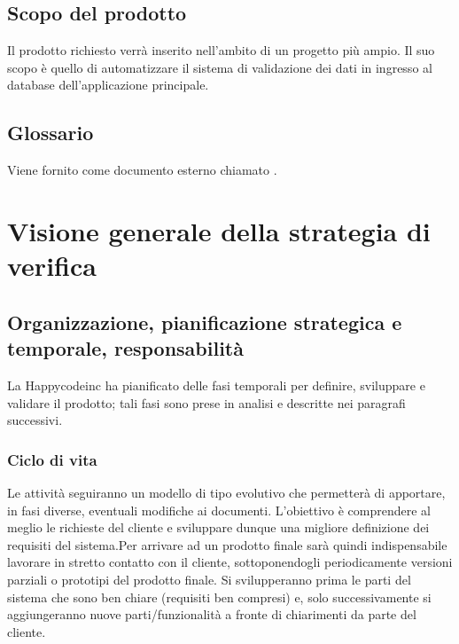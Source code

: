 \documentclass[11pt,titlepage,a4paper]{report}
\begin{document}
\section{Scopo del prodotto}
Il prodotto richiesto verr\`a inserito nell'ambito di un progetto pi\`u ampio. Il suo scopo \`e quello di automatizzare il sistema di validazione dei dati in ingresso al database dell'applicazione principale.

\section{Glossario}
Viene fornito come documento esterno chiamato \Glossario.

\chapter[Strategia di verifica]{Visione generale della strategia di verifica}
\section[Organizzazione, pianificazione, responsabilit\`a]{Organizzazione, pianificazione strategica e temporale, responsabilit\`a}
La Happycodeinc ha  pianificato delle fasi temporali per definire, sviluppare e validare il prodotto; tali fasi sono prese in analisi e descritte nei paragrafi successivi.

\subsection{Ciclo di vita}
Le attivit\`a seguiranno un modello di tipo evolutivo che permetter\`a di apportare, in fasi diverse, eventuali modifiche ai documenti. L'obiettivo \`e comprendere al meglio le richieste del cliente e sviluppare dunque una migliore definizione dei requisiti del sistema.\newline Per arrivare ad un prodotto finale sar\`a quindi indispensabile lavorare in stretto contatto con il cliente, sottoponendogli periodicamente versioni parziali o prototipi del prodotto finale. Si svilupperanno prima le parti del sistema che sono ben chiare (requisiti ben compresi) e, solo successivamente si aggiungeranno nuove parti/funzionalit\`a a fronte di chiarimenti da parte del cliente. 
\end{document}
